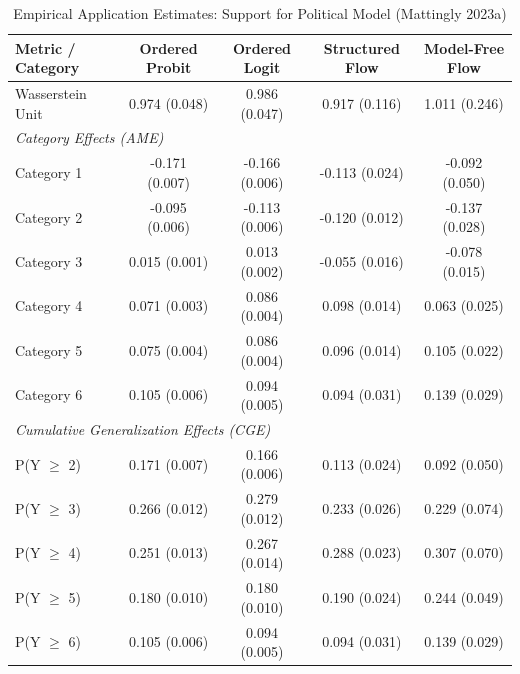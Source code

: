 \begin{table}[htbp]
\centering
\caption{Empirical Application Estimates: Support for Political Model (Mattingly 2023a)}
\label{tab:table_mattingly_empirical}
\small
\begin{tabular}{lcccc}
\toprule
\textbf{Metric / Category} & \textbf{Ordered Probit} & \textbf{Ordered Logit} & \textbf{Structured Flow} & \textbf{Model-Free Flow} \\
\midrule
Wasserstein Unit & 0.974 (0.048) & 0.986 (0.047) & 0.917 (0.116) & 1.011 (0.246) \\
\midrule
\multicolumn{5}{l}{\textit{Category Effects (AME)}} \\
  Category 1 & -0.171 (0.007) & -0.166 (0.006) & -0.113 (0.024) & -0.092 (0.050) \\
  Category 2 & -0.095 (0.006) & -0.113 (0.006) & -0.120 (0.012) & -0.137 (0.028) \\
  Category 3 & 0.015 (0.001) & 0.013 (0.002) & -0.055 (0.016) & -0.078 (0.015) \\
  Category 4 & 0.071 (0.003) & 0.086 (0.004) & 0.098 (0.014) & 0.063 (0.025) \\
  Category 5 & 0.075 (0.004) & 0.086 (0.004) & 0.096 (0.014) & 0.105 (0.022) \\
  Category 6 & 0.105 (0.006) & 0.094 (0.005) & 0.094 (0.031) & 0.139 (0.029) \\
\midrule
\multicolumn{5}{l}{\textit{Cumulative Generalization Effects (CGE)}} \\
  P(Y $\ge$ 2) & 0.171 (0.007) & 0.166 (0.006) & 0.113 (0.024) & 0.092 (0.050) \\
  P(Y $\ge$ 3) & 0.266 (0.012) & 0.279 (0.012) & 0.233 (0.026) & 0.229 (0.074) \\
  P(Y $\ge$ 4) & 0.251 (0.013) & 0.267 (0.014) & 0.288 (0.023) & 0.307 (0.070) \\
  P(Y $\ge$ 5) & 0.180 (0.010) & 0.180 (0.010) & 0.190 (0.024) & 0.244 (0.049) \\
  P(Y $\ge$ 6) & 0.105 (0.006) & 0.094 (0.005) & 0.094 (0.031) & 0.139 (0.029) \\
\bottomrule
\end{tabular}
\end{table}
